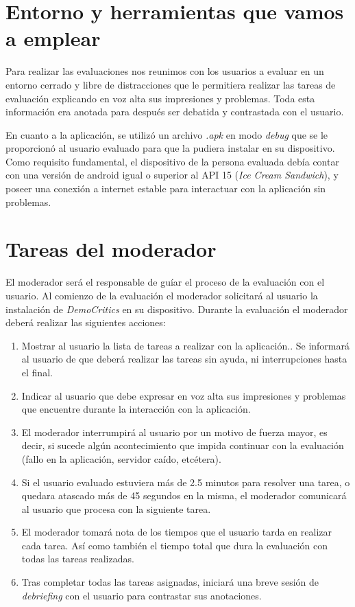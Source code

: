 \section{Entorno y herramientas que vamos a emplear}

Para realizar las evaluaciones nos reunimos con los usuarios a evaluar en un entorno cerrado y libre de distracciones que le permitiera realizar las tareas de evaluación explicando en voz alta sus impresiones y problemas. Toda esta información era anotada para después ser debatida y contrastada con el usuario.

En cuanto a la aplicación, se utilizó un archivo \textit{.apk} en modo \textit{debug} que se le proporcionó al usuario evaluado para que la pudiera instalar en su dispositivo. Como requisito fundamental, el dispositivo de la persona evaluada debía contar con una versión de android igual o superior al API 15 (\textit{Ice Cream Sandwich}), y poseer una conexión a internet estable para interactuar con la aplicación sin problemas.

\section{Tareas del moderador}

El moderador será el responsable de guíar el proceso de la evaluación con el usuario. Al comienzo de la evaluación el moderador solicitará al usuario la instalación de \textit{DemoCritics} en su dispositivo. Durante la evaluación el moderador deberá realizar las siguientes acciones:

\begin{enumerate}
 \item Mostrar al usuario la lista de tareas a realizar con la aplicación.. Se informará al usuario de que deberá realizar las tareas sin ayuda, ni interrupciones hasta el final.
 \item Indicar al usuario que debe expresar en voz alta sus impresiones y problemas que encuentre durante la interacción con la aplicación.
 \item El moderador interrumpirá al usuario por un motivo de fuerza mayor, es decir, si sucede algún acontecimiento que impida continuar con la evaluación (fallo en la aplicación, servidor caído, etcétera).
 \item Si el usuario evaluado estuviera más de 2.5 minutos para resolver una tarea, o quedara atascado más de 45 segundos en la misma, el moderador comunicará al usuario que procesa con la siguiente tarea.
 \item El moderador tomará nota de los tiempos que el usuario tarda en realizar cada tarea. Así como también el tiempo total que dura la evaluación con todas las tareas realizadas.
 \item Tras completar todas las tareas asignadas, iniciará una breve sesión de \textit{debriefing} con el usuario para contrastar sus anotaciones.
\end{enumerate}

